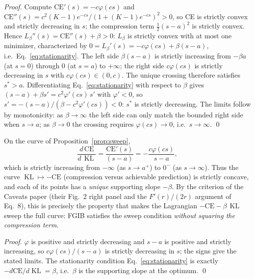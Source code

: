 \begin{proof}
Compute $\mathrm{CE}'(s) = -c\varphi(cs)$ and
$\mathrm{CE}''(s) = c^2 (K-1) e^{-cs}/(1 + (K-1)e^{-cs})^2 > 0$, so CE is strictly
convex and strictly decreasing in $s$; the compression term $\tfrac{1}{2}(s-a)^2$ is
strictly convex. Hence $L_\beta''(s) = \mathrm{CE}''(s) + \beta > 0$: $L_\beta$ is
strictly convex with at most one minimizer, characterized by
$0 = L_\beta'(s) = -c\varphi(cs) + \beta(s-a)$, i.e.\ Eq.~\eqref{eq:stationarity}.
The left side $\beta(s-a)$ is strictly increasing from $-\beta a$ (at $s=0$) through $0$
(at $s=a$) to $+\infty$; the right side $c\varphi(cs)$ is strictly decreasing in $s$
with $c\varphi(cs) \in (0, c)$. The unique crossing therefore satisfies $s^* > a$.
Differentiating Eq.~\eqref{eq:stationarity} with respect to $\beta$ gives
$(s-a) + \beta s' = c^2\varphi'(cs)\,s'$ with $\varphi' < 0$, so
$s' = -(s-a)/(\beta - c^2\varphi'(cs)) < 0$: $s^*$ is strictly decreasing.
The limits follow by monotonicity: as $\beta \to \infty$ the left side can only match
the bounded right side when $s \to a$; as $\beta \to 0$ the crossing requires
$\varphi(cs)\to 0$, i.e.\ $s \to \infty$. \hfill\qed
\end{proof}

\begin{proposition}\label{prop:curve}
On the curve of Proposition~\ref{prop:sweep},
\begin{equation}
\frac{d\,\mathrm{CE}}{d\,\operatorname{KL}}
= \frac{\mathrm{CE}'(s)}{(s-a)}
= -\frac{c\varphi(cs)}{s-a},
\label{eq:slope}
\end{equation}
which is strictly increasing from $-\infty$ (as $s \to a^+$) to $0^-$ (as $s \to
\infty$). Thus the curve $\operatorname{KL} \mapsto -\mathrm{CE}$ (compression versus
achievable prediction) is strictly concave, and each of its points has a \emph{unique}
supporting slope $-\beta$. By the criterion of the Caveats paper (their Fig.~2 right
panel and the $F'(r)/(2r)$ argument of Eq.~8), this is precisely the property that makes
the Lagrangian $-\mathrm{CE} - \beta\,\operatorname{KL}$ sweep the full curve: FGIB
satisfies the sweep condition \emph{without squaring the compression term}.
\end{proposition}

\begin{proof}
$\varphi$ is positive and strictly decreasing and $s-a$ is positive and strictly
increasing, so $c\varphi(cs)/(s-a)$ is strictly decreasing in $s$; the signs give the
stated limits. The stationarity condition Eq.~\eqref{eq:stationarity} is exactly
$-d\mathrm{CE}/d\operatorname{KL} = \beta$, i.e.\ $\beta$ is the supporting slope at the
optimum. \hfill\qed
\end{proof}

